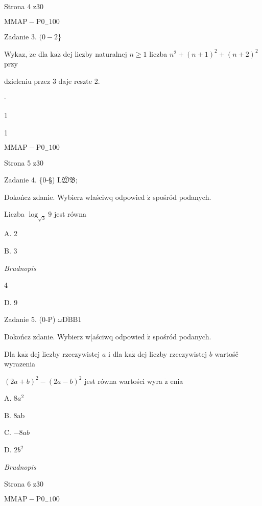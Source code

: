 \documentclass[a4paper,12pt]{article}
\begin{document}
Strona 4 z30

$\mathrm{M}\mathrm{M}\mathrm{A}\mathrm{P}-\mathrm{P}0_{-}100$















Zadanie 3. $(0-2$\}

Wykaz, $\dot{\mathrm{z}}\mathrm{e}$ dla $\mathrm{k}\mathrm{a}\dot{\mathrm{z}}$ dej liczby naturalnej $n\geq 1$ liczba $n^{2}+(n+1)^{2}+(n+2)^{2}$ przy

dzieleniu przez 3 daje reszte 2.

-

1

1

$\mathrm{M}\mathrm{M}\mathrm{A}\mathrm{P}-\mathrm{P}0_{-}100$

Strona 5 z30





Zadanie 4. \{0-\S) $\overline{\mathrm{L}\mathfrak{W}\mathfrak{B}}$;

Dokończ zdanie. Wybierz wlaściwq odpowied $\acute{\mathrm{z}}$ spośród podanych.

Liczba $\log_{\sqrt{3}}9$ jest równa

A. 2

B. 3

{\it Brudnopis}

4

D. 9

Zadanie 5. (0-P) $\overline{\omega \mathrm{D}\mathrm{B}\mathrm{B}}1$

Dokończ zdanie. Wybierz w[aściwq odpowied $\acute{\mathrm{z}}$ spośród podanych.

Dla $\mathrm{k}\mathrm{a}\dot{\mathrm{z}}$ dej liczby rzeczywistej $a$ i dla $\mathrm{k}\mathrm{a}\dot{\mathrm{z}}$ dej liczby rzeczywistej $b$ wartośč wyrazenia

$(2a+b)^{2}-(2a-b)^{2}$ jest równa wartości wyra $\dot{\mathrm{z}}$ enia

A. $8a^{2}$

B. 8ab

C. $-8ab$

D. $2b^{2}$

{\it Brudnopis}

Strona 6 z30

$\mathrm{M}\mathrm{M}\mathrm{A}\mathrm{P}-\mathrm{P}0_{-}100$
\end{document}
